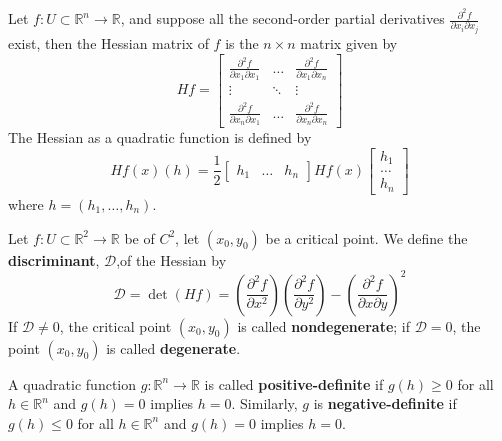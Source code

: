 \documentclass[openany]{book}
\newcommand{\R}{\mathbb{R}}
\begin{document}
\begin{defn}
    Let $f:U\subset\R^n\to\R$, and suppose all the second-order partial derivatives $\frac{\partial^2 f}{\partial x_i\partial x_j}$ exist, then the Hessian matrix of $f$ is the $n\times n$ matrix given by 
    \begin{equation*}
        Hf=\begin{bmatrix}
            \frac{\partial^2 f}{\partial x_1\partial x_1}&\dots&\frac{\partial^2f}{\partial x_1\partial x_n}\\
            \vdots&\ddots&\vdots\\
            \frac{\partial^2f}{\partial x_n\partial x_1}&\dots&\frac{\partial^2f}{\partial x_n\partial x_n}
        \end{bmatrix}
    \end{equation*}
    The Hessian as a quadratic function is defined by 
    \begin{equation*}
        Hf(x)(h)=\frac{1}{2}\begin{bmatrix}
            h_1&\dots&h_n
        \end{bmatrix}Hf(x)\begin{bmatrix}
            h_1\\
            \dots\\
            h_n
        \end{bmatrix}
    \end{equation*}
    where $h=(h_1,\dots,h_n)$.
\end{defn}

\begin{defn}
    Let $f:U\subset\R^2\to\R$ be of $C^2$, let $(x_0,y_0)$ be a critical point. We define the \textbf{discriminant}, \boldmath $\mathcal{D}$,\unboldmath of the Hessian by
    \begin{equation*}
        \mathcal{D}=\det (Hf)=\left(\frac{\partial^2f}{\partial x^2}\right)\left(\frac{\partial^2f}{\partial y^2}\right)-\left(\frac{\partial^2f}{\partial x\partial y}\right)^2
    \end{equation*}
    If $\mathcal{D}\neq 0$, the critical point $(x_0,y_0)$ is called \textbf{nondegenerate}; if $\mathcal{D}=0$, the point $(x_0,y_0)$ is called \textbf{degenerate}.
\end{defn}

\begin{defn}
    A quadratic function $g:\R^n\to\R$ is called \textbf{positive-definite} if $g(h)\geq 0$ for all $h\in\R^n$ and $g(h)=0$ implies $h=0$. Similarly, $g$ is \textbf{negative-definite} if $g(h)\leq 0$ for all $h\in\R^n$ and $g(h)=0$ implies $h=0$. 
\end{defn}
\end{document}
